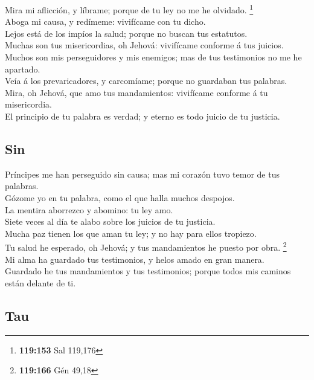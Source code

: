  Mira mi aflicción, y líbrame; porque de tu ley no me he
olvidado. \footnote{\textbf{119:153} Sal 119,176}\\
 Aboga mi causa, y redímeme: vivifícame con tu dicho.\\
 Lejos está de los impíos la salud; porque no buscan tus
estatutos.\\
 Muchas son tus misericordias, oh Jehová: vivifícame
conforme á tus juicios.\\
 Muchos son mis perseguidores y mis enemigos; mas de tus
testimonios no me he apartado.\\
 Veía á los prevaricadores, y carcomíame; porque no
guardaban tus palabras.\\
 Mira, oh Jehová, que amo tus mandamientos: vivifícame
conforme á tu misericordia.\\
 El principio de tu palabra es verdad; y eterno es todo
juicio de tu justicia.

\hypertarget{sin}{%
\subsection{Sin}\label{sin}}

 Príncipes me han perseguido sin causa; mas mi corazón
tuvo temor de tus palabras.\\
 Gózome yo en tu palabra, como el que halla muchos
despojos.\\
 La mentira aborrezco y abomino: tu ley amo.\\
 Siete veces al día te alabo sobre los juicios de tu
justicia.\\
 Mucha paz tienen los que aman tu ley; y no hay para ellos
tropiezo.\\
 Tu salud he esperado, oh Jehová; y tus mandamientos he
puesto por obra. \footnote{\textbf{119:166} Gén 49,18}\\
 Mi alma ha guardado tus testimonios, y helos amado en
gran manera.\\
 Guardado he tus mandamientos y tus testimonios; porque
todos mis caminos están delante de ti.

\hypertarget{tau}{%
\subsection{Tau}\label{tau}}

